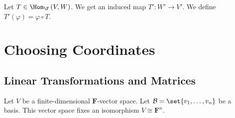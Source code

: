 \documentclass[10pt]{mypackage}
\begin{document}
\begin{definition}
  Let $T\in \Hom_{\F}\left(V,W\right)$. We get an induced map $T': W'\rightarrow V'$. We define $T'\left(\varphi\right) = \varphi\circ T$.
  \begin{center}
  \end{center}
\end{definition}
\section{Choosing Coordinates}%
\subsection{Linear Transformations and Matrices}%
Let $V$ be a finite-dimensional $\mathbf{F}$-vector space. Let $\mathcal{B} = \set{v_1,\dots,v_n}$ be a basis. This vector space fixes an isomorphism $V \cong \mathbf{F}^n$.\newline
\end{document}
